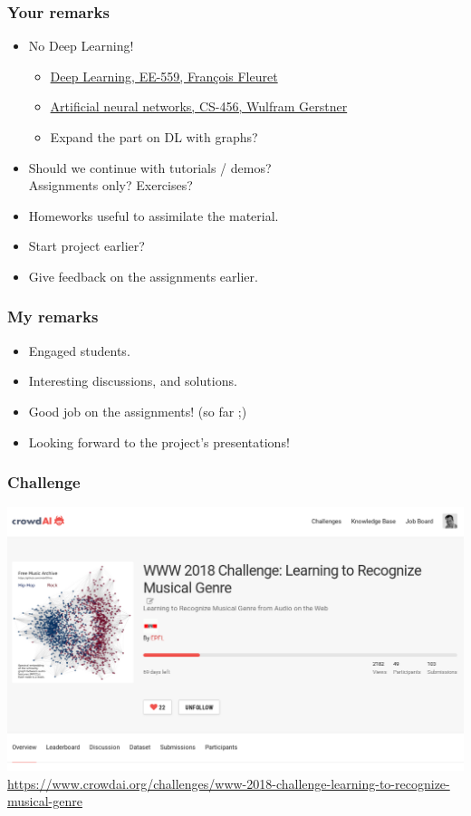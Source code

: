 \documentclass{beamer}
\begin{document}

\begin{frame}
	\frametitle{Your remarks}
	\begin{itemize}
		\item No Deep Learning!
		\begin{itemize}
			\item \href{http://edu.epfl.ch/coursebook/en/deep-learning-EE-559}{Deep Learning, EE-559, François Fleuret}
			\item \href{https://edu.epfl.ch/coursebook/en/artificial-neural-networks-CS-456}{Artificial neural networks, CS-456, Wulfram Gerstner}
			\item Expand the part on DL with graphs?
		\end{itemize}
		\vfill
		\item Should we continue with tutorials / demos?
			\\ Assignments only? Exercises?
		\vfill
		\item Homeworks useful to assimilate the material.
		\vfill
		\item Start project earlier?
		\vfill
		\item Give feedback on the assignments earlier.
	\end{itemize}
\end{frame}


\begin{frame}
	\frametitle{My remarks}
	\begin{itemize}
		\item Engaged students.
		\vfill
		\item Interesting discussions, and solutions.
		\vfill
		\item Good job on the assignments! (so far ;)
		\vfill
		\item Looking forward to the project's presentations!
	\end{itemize}
\end{frame}


\begin{frame}
	\frametitle{Challenge}
	\includegraphics[width=\linewidth]{fma_challenge}
	\vfill
	\tiny
	\url{https://www.crowdai.org/challenges/www-2018-challenge-learning-to-recognize-musical-genre}
\end{frame}
\end{document}
